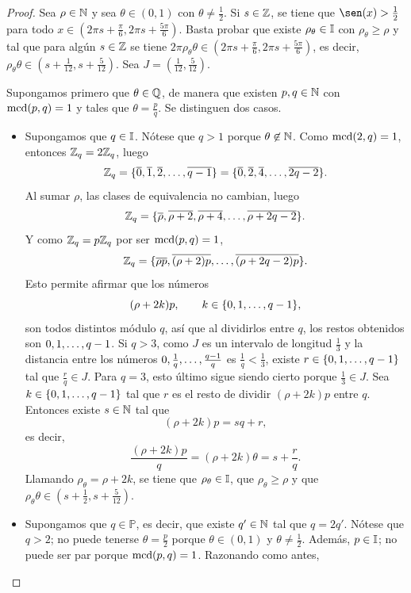 \documentclass[a4paper, 12pt, oneside]{book}
\begin{document}
\begin{proof}
    Sea $\rho\in \mathbb N$ y sea $\theta \in (0,1)$ con $\theta\neq\frac{1}{2}$. Si $s \in \mathbb Z$, se tiene que $\sen(x) > \frac{1}{2}$ para todo $x \in (2\pi s+\frac{\pi}{6},2\pi s+\frac{5\pi}{6})$. Basta probar que existe $\rho_\theta \in \mathbb I$ con $\rho_\theta \geq \rho$ y tal que para algún $s \in \mathbb Z$ se tiene $2\pi\rho_\theta\theta \in (2\pi s +\frac{\pi}{6},2\pi s +\frac{5\pi}{6})$, es decir, $\rho_\theta\theta \in (s+\frac{1}{12},s+\frac{5}{12})$. Sea $J=(\frac{1}{12},\frac{5}{12})$.

    Supongamos primero que $\theta \in \mathbb Q$, de manera que existen $p,q \in \mathbb N$ con $\textup{mcd}(p,q) = 1$ y tales que $\theta = \frac{p}{q}$. Se distinguen dos casos.
    \begin{itemize}
        \item Supongamos que $q \in \mathbb I$. Nótese que $q > 1$ porque $\theta \not\in\mathbb N$. Como $\textup{mcd}(2,q) = 1$, entonces $\mathbb Z_q = 2\mathbb Z_q$, luego
        \[\mathbb Z_q = \{\overline{0},\overline{1},\overline{2},\mathellipsis,\overline{q-1}\} = \{\overline{0},\overline{2},\overline{4},\mathellipsis,\overline{2q-2}\}.\]
        Al sumar $\rho$, las clases de equivalencia no cambian, luego
        \[\mathbb Z_q= \{\overline{\rho},\overline{\rho+2},\overline{\rho+4},\mathellipsis,\overline{\rho+2q-2}\}.\]
        Y como $\mathbb Z_q = p\mathbb Z_q$ por ser $\textup{mcd}(p,q) = 1$,
        \[\mathbb Z_q = \{\overline{\rho p},\overline{(\rho+2)p},\mathellipsis,\overline{(\rho+2q-2)p}\}.\]
        Esto permite afirmar que los números 
        \[(\rho+2k)p, \qquad k \in \{0,1,\mathellipsis,q-1\},\]
        son todos distintos módulo $q$, así que al dividirlos entre $q$, los restos obtenidos son $0,1,\mathellipsis,q-1$. Si $q > 3$, como $J$ es un intervalo de longitud $\frac{1}{3}$ y la distancia entre los números $0,\frac{1}{q},\mathellipsis,\frac{q-1}{q}$ es $\frac{1}{q} < \frac{1}{3}$, existe $r \in \{0,1,\mathellipsis,q-1\}$ tal que $\frac{r}{q} \in J$. Para $q = 3$, esto último sigue siendo cierto porque $\frac{1}{3} \in J$. Sea $k \in \{0,1,\mathellipsis,q-1\}$ tal que $r$ es el resto de dividir $(\rho+2k)p$ entre $q$. Entonces existe $s \in \mathbb N$ tal que
        \[(\rho+2k)p = sq + r,\]
        es decir,
        \[\frac{(\rho+2k)p}{q} = (\rho+2k)\theta = s + \frac{r}{q}.\]
        Llamando $\rho_\theta = \rho+2k$, se tiene que $\rho_\theta \in \mathbb I$, que $\rho_\theta \geq \rho$ y que $\rho_\theta\theta \in (s+\frac{1}{2},s+\frac{5}{12})$.
        \item Supongamos que $q \in \mathbb{P}$, es decir, que existe $q'\in\mathbb N$ tal que $q = 2q'$. Nótese que $q > 2$; no puede tenerse $\theta = \frac{p}{2}$ porque $\theta \in (0,1)$ y $\theta \neq \frac{1}{2}$. Además, $p \in \mathbb I$; no puede ser par porque $\textup{mcd}(p,q) = 1$. Razonando como antes,

\end{itemize}
\end{proof}
\end{document}
